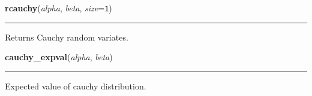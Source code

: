     \label{pymc:distributions:rcauchy}

    \vspace{0.5ex}

    \begin{boxedminipage}{\textwidth}

    \raggedright \textbf{rcauchy}(\textit{alpha}, \textit{beta}, \textit{size}=\texttt{1})

    \vspace{-1.5ex}

    \rule{\textwidth}{0.5\fboxrule}

Returns Cauchy random variates.
    \vspace{1ex}

    \end{boxedminipage}

    \label{pymc:distributions:cauchy_expval}

    \vspace{0.5ex}

    \begin{boxedminipage}{\textwidth}

    \raggedright \textbf{cauchy\_expval}(\textit{alpha}, \textit{beta})

    \vspace{-1.5ex}

    \rule{\textwidth}{0.5\fboxrule}

Expected value of cauchy distribution.
    \vspace{1ex}

    \end{boxedminipage}

    \label{pymc:distributions:cauchy_like}

    \vspace{0.5ex}

